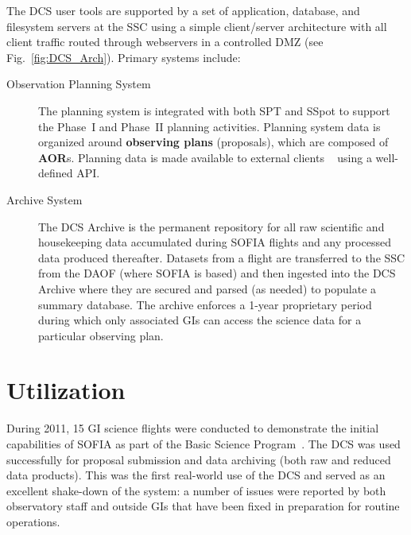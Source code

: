 The DCS user tools are supported by a set of application, database, and filesystem servers at the SSC using a simple client/server architecture with all client traffic routed through webservers in a controlled DMZ (see Fig.~\ref{fig:DCS_Arch}).  Primary systems include:


\begin{description}


\item[Observation Planning System] The planning system is integrated with both SPT and SSpot to support the Phase~I and Phase~II planning activities.  Planning system data is organized around {\bf observing plans} (proposals), which are composed of {\bf AOR}s.  Planning data is made available to external clients ~\citep[e.g. Flight Management Infrastructure,][]{Gross:2009} using a well-defined API.  

\item[Archive System] The DCS Archive is the permanent repository for all raw scientific and housekeeping data accumulated during SOFIA flights and any processed data produced thereafter. Datasets from a flight are transferred to the SSC from the DAOF (where SOFIA is based) and then ingested into the DCS Archive where they are secured and parsed (as needed) to populate a summary database.  The archive enforces a 1-year proprietary period during which only associated GIs can access the science data for a particular observing plan.

\end{description}






\section{Utilization}

During 2011, 15 GI science flights were conducted to demonstrate the initial capabilities of SOFIA as part of the Basic Science Program~\citep{Young:2012}.  The DCS was used successfully for proposal submission and data archiving (both raw and reduced data products).  This was the first real-world use of the DCS and served as an excellent shake-down of the system:  a number of issues were reported by both observatory staff and outside GIs that have been fixed in preparation for routine operations.


